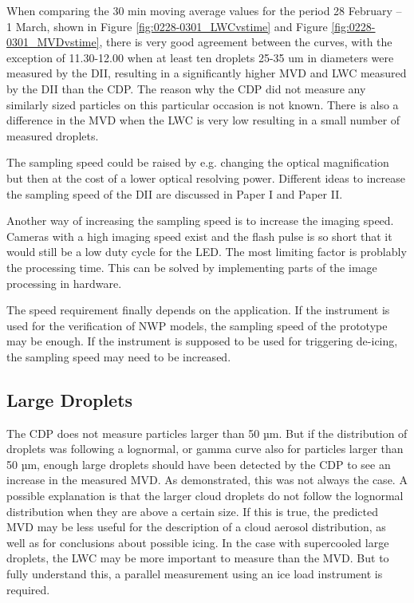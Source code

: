 When comparing the 30 min moving average values for the period 28 February -- 1 March, shown in Figure \ref{fig:0228-0301_LWCvstime} and Figure \ref{fig:0228-0301_MVDvstime}, there is very good agreement between the curves, with the exception of 11.30-12.00 when at least ten droplets 25-35 um in diameters were measured by the DII, resulting in a significantly higher MVD and LWC measured by the DII than the CDP. The reason why the CDP did not measure any similarly sized particles on this particular occasion is not known. There is also a difference in the MVD when the LWC is very low resulting in a small number of measured droplets.

The sampling speed could be raised by e.g. changing the optical magnification but then at the cost of a lower optical resolving power. Different ideas to increase the sampling speed of the DII are discussed in Paper I and Paper II.

Another way of increasing the sampling speed is to increase the imaging speed. Cameras with a high imaging speed exist and the flash pulse is so short that it would still be a low duty cycle for the LED. The most limiting factor is problably the processing time. This can be solved by implementing parts of the image processing in hardware.

The speed requirement finally depends on the application. If the instrument is used for the verification of NWP models, the sampling speed of the prototype may be enough. If the instrument is supposed to be used for triggering de-icing, the sampling speed may need to be increased.

\subsection{Large Droplets}

The CDP does not measure particles larger than 50 µm. But if the distribution of droplets was following a lognormal, or gamma curve \cite{miles2000,lee2010} also for particles larger than 50 µm, enough large droplets should have been detected by the CDP to see an increase in the measured MVD. As demonstrated, this was not always the case. A possible explanation is that the larger cloud droplets do not follow the lognormal distribution when they are above a certain size. If this is true, the predicted MVD may be less useful for the description of a cloud aerosol distribution, as well as for conclusions about possible icing. In the case with supercooled large droplets, the LWC may be more important to measure than the MVD. But to fully understand this, a parallel measurement using an ice load instrument is required.

